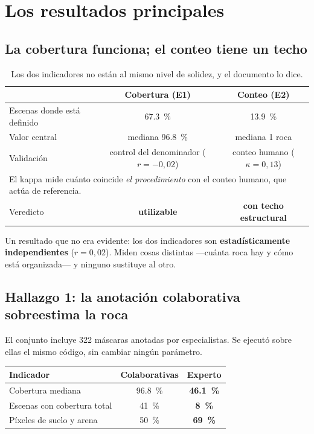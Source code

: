 \documentclass[11pt]{article}
\begin{document}
\section{Los resultados principales}

\subsection{La cobertura funciona; el conteo tiene un techo}

\begin{table}[H]
\centering\small
\begin{tabular}{lcc}
\toprule
 & \textbf{Cobertura (E1)} & \textbf{Conteo (E2)}\\
\midrule
Escenas donde está definido & \SI{67.3}{\percent} & \SI{13.9}{\percent}\\
Valor central & mediana \SI{96.8}{\percent} & mediana 1 roca\\
Validación & control del denominador ($r=-0{,}02$) & conteo humano ($\kappa = 0{,}13$)\\
\multicolumn{3}{l}{\footnotesize El kappa mide cuánto coincide \emph{el procedimiento} con
el conteo humano, que actúa de referencia.}\\
Veredicto & \textbf{\color{verde}utilizable} & \textbf{\color{rojo}con techo estructural}\\
\bottomrule
\end{tabular}
\caption{Los dos indicadores no están al mismo nivel de solidez, y el documento lo dice.}
\end{table}

Un resultado que no era evidente: los dos indicadores son \textbf{estadísticamente
independientes} ($r = 0{,}02$). Miden cosas distintas —cuánta roca hay y cómo está
organizada— y ninguno sustituye al otro.

\subsection{Hallazgo 1: la anotación colaborativa sobreestima la roca}
\label{sec:sesgo-doc}

El conjunto incluye \num{322} máscaras anotadas por especialistas. Se ejecutó sobre ellas
el mismo código, sin cambiar ningún parámetro.

\begin{table}[H]
\centering\small
\begin{tabular}{lcc}
\toprule
\textbf{Indicador} & \textbf{Colaborativas} & \textbf{Experto}\\
\midrule
Cobertura mediana & \SI{96.8}{\percent} & \textbf{\SI{46.1}{\percent}}\\
Escenas con cobertura total & \SI{41}{\percent} & \textbf{\SI{8}{\percent}}\\
Píxeles de suelo y arena & \SI{50}{\percent} & \textbf{\SI{69}{\percent}}\\
\bottomrule
\end{tabular}
\end{table}
\end{document}
